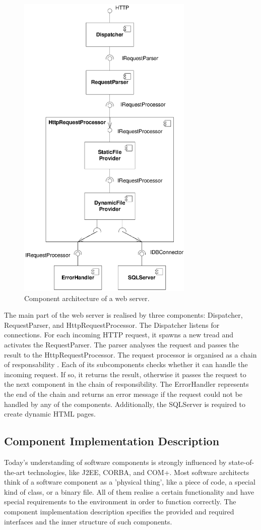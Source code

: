 \begin{figure}[htbp]
\centering
\includegraphics[width=3.3in]{example/WebserverComponents}
\caption{Component architecture of a web server.}
\label{fig:WebserverComponents}
\end{figure}

The main part of the web server is realised by three components: Dispatcher,
RequestParser, and HttpRequestProcessor. The Dispatcher listens for connections.
For each incoming HTTP request, it spawns a new tread and
activates the RequestParser. The parser analyses the request and passes the
result to the HttpRequestProcessor. The request processor is organised as a
chain of responsability \cite{gamma1995a}. Each of its subcomponents checks
whether it can handle the incoming request. If so, it returns the result,
otherwise it passes the request to the next component in the chain of
responsibility. The ErrorHandler represents the end of the chain and returns an
error message if the request could not be handled by any of the components.
Additionally, the SQLServer is required to create dynamic HTML pages.

\subsection*{Component Implementation Description}
Today's understanding of software components is strongly influenced by
state-of-the-art technologies, like J2EE, CORBA, and COM+.
Most software architects think of a software component as a 'physical thing',
like a piece of code, a special kind of class, or a binary file. All of them
realise a certain functionality and have special requirements to the
environment in order to function correctly.
The component implementation description specifies the provided and required
interfaces and the inner structure of such components.

